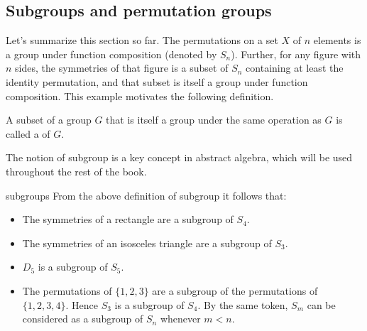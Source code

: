 \subsection{Subgroups and permutation groups}

Let's summarize this section so far.  The permutations on a set $X$ of $n$ elements is a group under function composition (denoted by  $S_n$).  Further, for any figure with $n$ sides, the symmetries of that figure is a subset of $S_n$ containing at least the identity permutation, and that subset is itself a group under function composition.  This example motivates the following definition.

\begin{defn}
A subset of a group $G$ that is itself a group under the same operation as $G$ is called a  of $G$.  
\end{defn}

The notion of subgroup is a key concept in abstract algebra, which will be used throughout the rest of the book.  

\begin{example}{subgroups}
From the above definition of subgroup it follows that:
\begin{itemize}
\item
The symmetries of a rectangle are a subgroup of $S_4$. 
\item
The symmetries of an isosceles triangle are a subgroup of $S_3$.
\item
$D_5$ is a subgroup of $S_5$.
\item
The permutations of $\{1,2,3\}$ are a subgroup of the permutations of $\{1,2,3,4\}$. Hence $S_3$ is a subgroup of $S_4$. By the same token, $S_m$ can be considered as a subgroup of $S_n$ whenever $m < n$.
\end{itemize}
\end{example}



